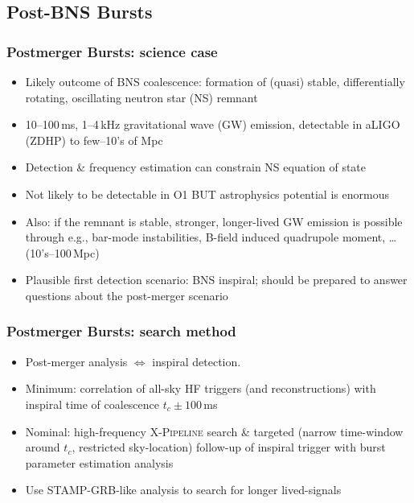 \documentclass{beamer}
\def\gw#1{gravitational wave#1 (GW#1)\gdef\gw{GW}}
\def\ns#1{neutron star#1 (NS#1)\gdef\ns{NS}}
\begin{document}
\subsection{Post-BNS Bursts}

\begin{frame}
    \frametitle{Postmerger Bursts: science case}
    \begin{itemize}
        \item Likely outcome of BNS coalescence: formation of (quasi) stable,
            differentially rotating, oscillating \ns{} remnant
        \item 10--100\,ms, 1--4\,kHz \gw{} emission, detectable in aLIGO (ZDHP) to
            few--10's of Mpc 
        \item Detection \& frequency estimation can constrain \ns{} equation of
            state
        \item Not likely to be detectable in O1  BUT astrophysics potential is
            enormous
        \item Also: if the remnant is stable, stronger, longer-lived \gw{}
            emission is possible through e.g., bar-mode instabilities, B-field
            induced quadrupole moment, \dots (10's--100\,Mpc)
        \item Plausible first detection scenario: BNS inspiral; should be
            prepared to answer questions about the post-merger scenario
    \end{itemize}
\end{frame}

\begin{frame}
    \frametitle{Postmerger Bursts: search method}
    \begin{itemize}
        \item Post-merger analysis $\iff$ inspiral detection.
        \item Minimum: correlation of all-sky HF triggers (and reconstructions)
            with inspiral time of coalescence $t_c \pm 100$\,ms
        \item Nominal: high-frequency \textsc{X-Pipeline} search \& targeted
            (narrow time-window around $t_c$, restricted sky-location) follow-up
            of inspiral trigger with burst parameter estimation analysis
        \item Use STAMP-GRB-like analysis to search for longer lived-signals
    \end{itemize}
\end{frame}
\end{document}
